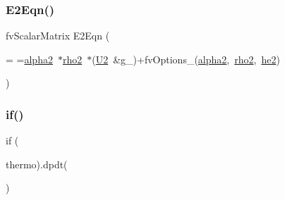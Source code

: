 \subsubsection{\texorpdfstring{E2\+Eqn()}{E2Eqn()}}
{\footnotesize\ttfamily fv\+Scalar\+Matrix E2\+Eqn (\begin{DoxyParamCaption}\item[{fvm\+::ddt(\hyperlink{UEqns__2p_8H_abe544d8197b804c4439afde6d860d5d7}{alpha2}, \hyperlink{UEqns__2p_8H_a2a5e0e37e61560baf7b55ce8b70e01c0}{rho2}, \hyperlink{EEqns__2p_8H_af939283a47b2563040fc040c5bd500d5}{he2})+fvm\+::div(\hyperlink{updateAlphaPhiAndInitControls__1p_8H_adb16eab5a684ddb62e40a6ffdc2d646c}{fluid2\+\_\+.\+alpha\+Rho\+Phi}(), \hyperlink{EEqns__2p_8H_af939283a47b2563040fc040c5bd500d5}{he2}, \char`\"{}div(\hyperlink{updateAlphaPhiAndInitControls__1p_8H_adb16eab5a684ddb62e40a6ffdc2d646c}{alpha\+Rho\+Phi},\hyperlink{EEqn__1pl_8H_aaacc8fea926e2b83e418a1ad3c1e8c43}{he})\char`\"{}) -\/((structure\+\_\+.\+tortuosity\+Ptr().valid()) ? fvm\+::laplacian(fvc\+::interpolate(\hyperlink{UEqns__2p_8H_abe544d8197b804c4439afde6d860d5d7}{alpha2}) $\ast$fvc\+::interpolate(structure\+\_\+.\+tortuosity() $\ast$\hyperlink{EEqns__2p_8H_a267118422a918bf7e522eb6585ef474e}{alpha\+Eff2}), \hyperlink{EEqns__2p_8H_af939283a47b2563040fc040c5bd500d5}{he2}) \+:fvm\+::laplacian(fvc\+::interpolate(\hyperlink{UEqns__2p_8H_abe544d8197b804c4439afde6d860d5d7}{alpha2}) $\ast$fvc\+::interpolate(\hyperlink{EEqns__2p_8H_a267118422a918bf7e522eb6585ef474e}{alpha\+Eff2}), \hyperlink{EEqns__2p_8H_af939283a47b2563040fc040c5bd500d5}{he2}))}]{ = {\ttfamily =\hyperlink{UEqns__2p_8H_abe544d8197b804c4439afde6d860d5d7}{alpha2}~$\ast$\hyperlink{UEqns__2p_8H_a2a5e0e37e61560baf7b55ce8b70e01c0}{rho2}~$\ast$(\hyperlink{UEqns__2p_8H_af55bc79119bfe60c39e86c5ddf988e7a}{U2}~\&g\+\_\+)+fvOptions\+\_\+(\hyperlink{UEqns__2p_8H_abe544d8197b804c4439afde6d860d5d7}{alpha2},~\hyperlink{UEqns__2p_8H_a2a5e0e37e61560baf7b55ce8b70e01c0}{rho2},~\hyperlink{EEqns__2p_8H_af939283a47b2563040fc040c5bd500d5}{he2})} }\end{DoxyParamCaption})}

\mbox{\label{EEqns__2p_8H_a8a98436e04a507a69c16dbd95b223199}} 
\subsubsection{\texorpdfstring{if()}{if()}\hspace{0.1cm}{\footnotesize\ttfamily [2/8]}}
{\footnotesize\ttfamily if (\begin{DoxyParamCaption}\item[{fluid1\+\_\+.}]{thermo).\+dpdt( }\end{DoxyParamCaption})}

